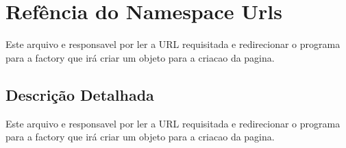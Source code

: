 \hypertarget{namespaceUrls}{\section{Refência do Namespace Urls}
\label{namespaceUrls}
}


Este arquivo e responsavel por ler a U\-R\-L requisitada e redirecionar o programa para a factory que irá criar um objeto para a criacao da pagina.  




\subsection{Descrição Detalhada}
Este arquivo e responsavel por ler a U\-R\-L requisitada e redirecionar o programa para a factory que irá criar um objeto para a criacao da pagina. 